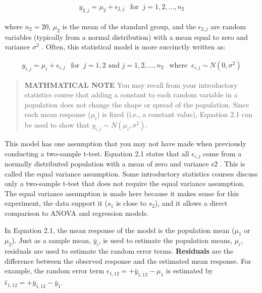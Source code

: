 \documentclass[
]{report}
\begin{document}
\begin{align}
y_{2, j} = \mu_2 + \epsilon_{2, j}  ~~\text{ for }~ j = 1, 2, ... ,n_2
\end{align}

where \(n_2 = 20\), \(\mu_2\) is the mean of the standard group, and the \(\epsilon_{2, j}\) are random variables (typically from a
normal distribution) with a mean equal to zero and variance \(\sigma^2\) . Often, this statistical model is more succinctly written as:

\begin{align} \label{2.1}
y_{i, j} = \mu_i + \epsilon_{i, j} ~~\text{ for }~ j = 1, 2 \text{ and } j = 1, 2, ... ,n_2 ~~\text{ where }~  \epsilon_{i, j} \sim N(0,\sigma^2)
\tag{2.1}
\end{align}

\begin{quote}
\textbf{MATHMATICAL NOTE}
You may recall from your introductory statistics course that adding a constant to each random variable in a population does not change the shape or spread of the population. Since each mean response (\(\mu_i\)) is fixed (i.e., a constant value), Equation 2.1 can be used to show that \(y_{i, j} \sim N(\mu_i,\sigma^2)\).
\end{quote}

This model has one assumption that you may not have made when previously conducting a two-sample t-test. Equation 2.1 states that all \(\epsilon_{i, j}\) come from a normally distributed population with a mean of zero and
variance s2 . This is called the equal variance assumption. Some introductory statistics courses discuss only a two-sample t-test that does not require the equal variance assumption. The equal variance assumption is
made here because it makes sense for this experiment, the data support it (\(s_1\) is close to \(s_2\)), and it allows a direct comparison to ANOVA and regression models.

In Equation 2.1, the mean response of the model is the population mean (\(\mu_1\) or \(\mu_2\)). Just as a sample mean, \(\bar{y}_i\), is used to estimate the population means, \(\mu_i\), residuals are used to estimate the random error terms. \textbf{Residuals} are the difference between the observed response and the estimated mean response. For example, the random error term \(\epsilon_{1, 12} = + \bar{y}_{1, 12} - \mu_1\) is estimated by \(\hat{\epsilon}_{1, 12} = + \bar{y}_{1, 12} - \bar{y}_1\).
\end{document}
